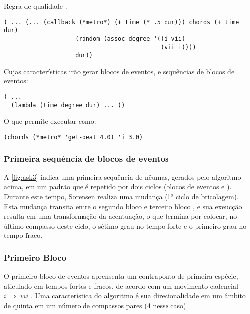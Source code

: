 \begin{example}{Regra de qualidade .}
\begin{verbatim}
( ... (... (callback (*metro*) (+ time (* .5 dur))) chords (+ time dur)
                    (random (assoc degree '((i vii)
                                            (vii i))))
                    dur))
\end{verbatim}

Cujas características irão gerar blocos de eventos, e sequências de blocos de eventos:

\begin{verbatim}
( ...
  (lambda (time degree dur) ... ))
\end{verbatim}

O que permite executar como:
\begin{verbatim}
(chords (*metro* 'get-beat 4.0) 'i 3.0)
\end{verbatim}
\end{example}

\subsubsection{Primeira sequência de blocos de eventos}\label{sec:primeiro_evento}

A \autoref{fig:ask3} indica uma primeira sequência de nêumas, gerados pelo algoritmo acima, em um padrão que é repetido por dois ciclos (blocos de eventos  e ). Durante este tempo, Sorensen realiza uma mudança (1$^o$ ciclo de bricolagem). Esta mudança transita entre o segundo bloco  e terceiro bloco , e sua exeucção resulta em uma transformação da acentuação, o que termina por colocar, no último compasso deste ciclo, o sétimo grau no tempo forte e o primeiro grau no tempo fraco. 

\subsubsection*{Primeiro Bloco}

O primeiro bloco de eventos  aprensenta um contraponto de primeira espécie, aticulado em tempos fortes e fracos, de acordo com um movimento cadencial $i~\Rightarrow~vii$ . Uma característica  do algoritmo é sua direcionalidade em um âmbito de quinta em um número de compassos pares (4 nesse caso). 

